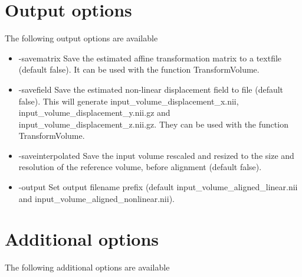 
\section{Output options}

The following output options are available

\begin{itemize}

\item -savematrix
\newline \newline Save the estimated affine transformation matrix to a textfile (default false). It can be used with the function TransformVolume.

\item -savefield                 
\newline \newline Save the estimated non-linear displacement field to file (default false). This will generate input\_volume\_displacement\_x.nii,\\ input\_volume\_displacement\_y.nii.gz and input\_volume\_displacement\_z.nii.gz. They can be used with the function TransformVolume.

\item -saveinterpolated          
\newline \newline Save the input volume rescaled and resized to the size and resolution of the reference volume, before alignment (default false). 

\item -output 
\newline \newline Set output filename prefix (default input\_volume\_aligned\_linear.nii and input\_volume\_aligned\_nonlinear.nii). 

\end{itemize}

\section{Additional options}

The following additional options are available

